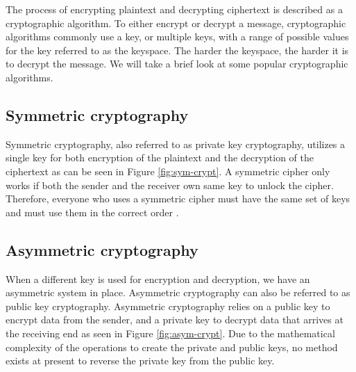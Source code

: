 The process of encrypting plaintext and decrypting ciphertext is described as a cryptographic algorithm. To either encrypt or decrypt a message, cryptographic algorithms commonly use a key, or multiple keys, with a range of possible values for the key referred to as the keyspace. The harder the keyspace, the harder it is to decrypt the message. We will take a brief look at some popular cryptographic algorithms.

\subsection{Symmetric cryptography}
Symmetric cryptography, also referred to as private key cryptography, utilizes a single key for both encryption of the plaintext and the decryption of the ciphertext as can be seen in Figure \ref{fig:sym-crypt}. A symmetric cipher only works if both the sender and the receiver own same key to unlock the cipher. Therefore, everyone who uses a symmetric cipher must have the same set of keys and must use them in the correct order \cite{dooley2018history}.


\subsection{Asymmetric cryptography}
When a different key is used for encryption and decryption, we have an asymmetric system in place. Asymmetric cryptography can also be referred to as public key cryptography. Asymmetric cryptography relies on a public key to encrypt data from the sender, and a private key to decrypt data that arrives at the receiving end as seen in Figure \ref{fig:asym-crypt}. Due to the mathematical complexity of the operations to create the private and public keys, no method exists at present to reverse the private key from the public key.


